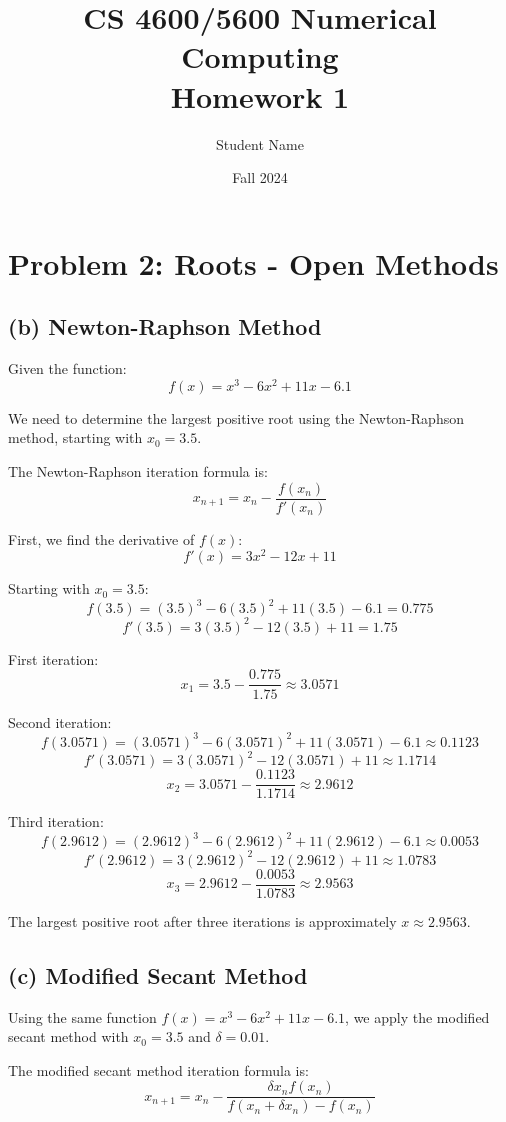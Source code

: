 \documentclass[12pt]{article}
\title{CS 4600/5600 Numerical Computing\\ Homework 1}
\author{Student Name}
\date{Fall 2024}
\begin{document}
\maketitle

\section*{Problem 2: Roots - Open Methods}

\subsection*{(b) Newton-Raphson Method}

Given the function:
\[
f(x) = x^3 - 6x^2 + 11x - 6.1
\]

We need to determine the largest positive root using the Newton-Raphson method, starting with \(x_0 = 3.5\).

The Newton-Raphson iteration formula is:
\[
x_{n+1} = x_n - \frac{f(x_n)}{f'(x_n)}
\]

First, we find the derivative of \(f(x)\):
\[
f'(x) = 3x^2 - 12x + 11
\]

Starting with \(x_0 = 3.5\):
\[
f(3.5) = (3.5)^3 - 6(3.5)^2 + 11(3.5) - 6.1 = 0.775
\]
\[
f'(3.5) = 3(3.5)^2 - 12(3.5) + 11 = 1.75
\]

First iteration:
\[
x_1 = 3.5 - \frac{0.775}{1.75} \approx 3.0571
\]

Second iteration:
\[
f(3.0571) = (3.0571)^3 - 6(3.0571)^2 + 11(3.0571) - 6.1 \approx 0.1123
\]
\[
f'(3.0571) = 3(3.0571)^2 - 12(3.0571) + 11 \approx 1.1714
\]
\[
x_2 = 3.0571 - \frac{0.1123}{1.1714} \approx 2.9612
\]

Third iteration:
\[
f(2.9612) = (2.9612)^3 - 6(2.9612)^2 + 11(2.9612) - 6.1 \approx 0.0053
\]
\[
f'(2.9612) = 3(2.9612)^2 - 12(2.9612) + 11 \approx 1.0783
\]
\[
x_3 = 2.9612 - \frac{0.0053}{1.0783} \approx 2.9563
\]

The largest positive root after three iterations is approximately \(x \approx 2.9563\).

\subsection*{(c) Modified Secant Method}

Using the same function \(f(x) = x^3 - 6x^2 + 11x - 6.1\), we apply the modified secant method with \(x_0 = 3.5\) and \(\delta = 0.01\).

The modified secant method iteration formula is:
\[
x_{n+1} = x_n - \frac{\delta x_n f(x_n)}{f(x_n + \delta x_n) - f(x_n)}
\]
\end{document}

